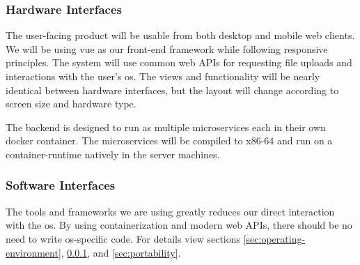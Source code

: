         \subsubsection{Hardware Interfaces}\label{sec:hardware-interfaces}
            The user-facing product will be usable from both desktop and mobile web clients. We will be using \gls{vue} as our front-end framework while following \gls{responsive} principles. The system will use common web APIs for requesting file uploads and interactions with the user's \gls{os}. The views and functionality will be nearly identical between hardware interfaces, but the layout will change according to screen size and hardware type.
        \par The backend is designed to run as multiple \glspl{microservice} each in their own \gls{docker} container. The \glspl{microservice} will be compiled to \gls{x86-64} and run on a \gls{container-runtime} natively in the server machines.
        \subsubsection{Software Interfaces}\label{sec:software-interfaces}
            The tools and frameworks we are using greatly reduces our direct interaction with the \gls{os}. By using containerization and modern web APIs, there should be no need to write \gls{os}-specific code. For details view sections \ref{sec:operating-environment}, \ref{sec:hardware-interfaces}, and \ref{sec:portability}.

